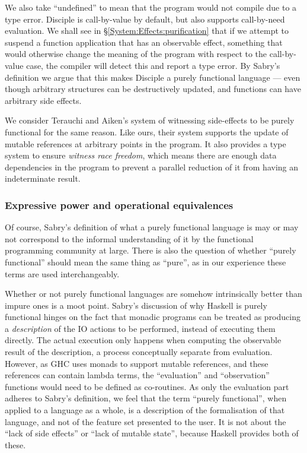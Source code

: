 We also take ``undefined'' to mean that the program would not compile due to a type error. Disciple is call-by-value by default, but also supports call-by-need evaluation. We shall see in \S\ref{System:Effects:purification} that if we attempt to suspend a function application that has an observable effect, something that would otherwise change the meaning of the program with respect to the call-by-value case, the compiler will detect this and report a type error. By Sabry's definition we argue that this makes Disciple a purely functional language --- even though arbitrary structures can be destructively updated, and functions can have arbitrary side effects. 

We consider Terauchi and Aiken's system of witnessing side-effects \cite{terauchi:witnessing-side-effects} to be purely functional for the same reason. Like ours, their system supports the update of mutable references at arbitrary points in the program. It also provides a type system to ensure \emph{witness race freedom}, which means there are enough data dependencies in the program to prevent a parallel reduction of it from having an indeterminate result. 

\subsubsection{Expressive power and operational equivalences}

Of course, Sabry's definition of what a purely functional language is may or may not correspond to the informal understanding of it by the functional programming community at large. There is also the question of whether ``purely functional'' should mean the same thing as ``pure'', as in our experience these terms are used interchangeably. 

Whether or not purely functional languages are somehow intrinsically better than impure ones is a moot point. Sabry's discussion of why Haskell is purely functional hinges on the fact that monadic programs can be treated as producing a \emph{description} of the IO actions to be performed, instead of executing them directly. The actual execution only happens when computing the observable result of the description, a process conceptually separate from evaluation. However, as GHC uses monads to support mutable references, and these references can contain lambda terms, the ``evaluation'' and ``observation'' functions would need to be defined as co-routines. As only the evaluation part adheres to Sabry's definition, we feel that the term ``purely functional'', when applied to a language as a whole, is a description of the formalisation of that language, and not of the feature set presented to the user. It is not about the ``lack of side effects'' or ``lack of mutable state'', because Haskell provides both of these. 

